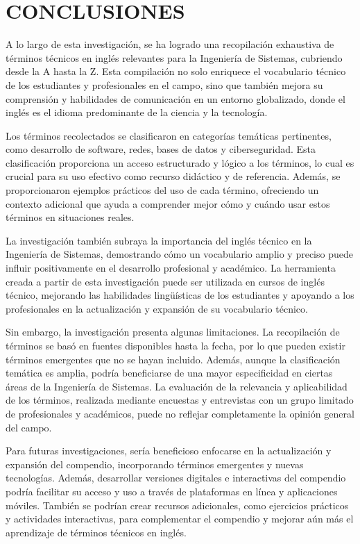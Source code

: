\section{CONCLUSIONES}
A lo largo de esta investigación, se ha logrado una recopilación exhaustiva de términos técnicos en inglés relevantes para la Ingeniería de Sistemas, cubriendo desde la A hasta la Z. Esta compilación no solo enriquece el vocabulario técnico de los estudiantes y profesionales en el campo, sino que también mejora su comprensión y habilidades de comunicación en un entorno globalizado, donde el inglés es el idioma predominante de la ciencia y la tecnología.

Los términos recolectados se clasificaron en categorías temáticas pertinentes, como desarrollo de software, redes, bases de datos y ciberseguridad. Esta clasificación proporciona un acceso estructurado y lógico a los términos, lo cual es crucial para su uso efectivo como recurso didáctico y de referencia. Además, se proporcionaron ejemplos prácticos del uso de cada término, ofreciendo un contexto adicional que ayuda a comprender mejor cómo y cuándo usar estos términos en situaciones reales.

La investigación también subraya la importancia del inglés técnico en la Ingeniería de Sistemas, demostrando cómo un vocabulario amplio y preciso puede influir positivamente en el desarrollo profesional y académico. La herramienta creada a partir de esta investigación puede ser utilizada en cursos de inglés técnico, mejorando las habilidades lingüísticas de los estudiantes y apoyando a los profesionales en la actualización y expansión de su vocabulario técnico.

Sin embargo, la investigación presenta algunas limitaciones. La recopilación de términos se basó en fuentes disponibles hasta la fecha, por lo que pueden existir términos emergentes que no se hayan incluido. Además, aunque la clasificación temática es amplia, podría beneficiarse de una mayor especificidad en ciertas áreas de la Ingeniería de Sistemas. La evaluación de la relevancia y aplicabilidad de los términos, realizada mediante encuestas y entrevistas con un grupo limitado de profesionales y académicos, puede no reflejar completamente la opinión general del campo.

Para futuras investigaciones, sería beneficioso enfocarse en la actualización y expansión del compendio, incorporando términos emergentes y nuevas tecnologías. Además, desarrollar versiones digitales e interactivas del compendio podría facilitar su acceso y uso a través de plataformas en línea y aplicaciones móviles. También se podrían crear recursos adicionales, como ejercicios prácticos y actividades interactivas, para complementar el compendio y mejorar aún más el aprendizaje de términos técnicos en inglés.

